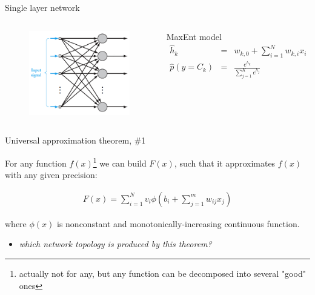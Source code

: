 \documentclass{beamer}
\begin{document}
\begin{frame}{Single layer network}

\begin{columns}[t]

\begin{figure}[h!]
  \centering
  \includegraphics[width=1\textwidth]{images/single_layer.png}
\end{figure}	


\begin{block}{MaxEnt model}
\begin{eqnarray*}
\hat{h}_k &=& w_{k, 0} + \sum_{i=1}^N w_{k, i} x_i \\
\hat{p}\left(y = C_k\right) &=& \frac{e^{h_k}}{\sum_{j=1}^K e^{h_j}}
\end{eqnarray*}
\end{block}
	
\end{columns}

\end{frame}


\begin{frame}{Universal approximation theorem, \#1}

For any function $f(x)$\footnote{actually not for any, but any function can be decomposed into several "good" ones} we can build $F(x)$, such that it approximates $f(x)$ with any given precision:

\begin{eqnarray*}
F\left(x\right) = \sum_{i=1}^N v_i \phi\left(b_i + \sum_{j=1}^m w_{ij} x_j\right)
\end{eqnarray*}

where $\phi(x)$ is nonconstant and monotonically-increasing continuous function.

\begin{itemize}
\item \textit{which network topology is produced by this theorem?}
\end{itemize}

\end{frame}
\end{document}
